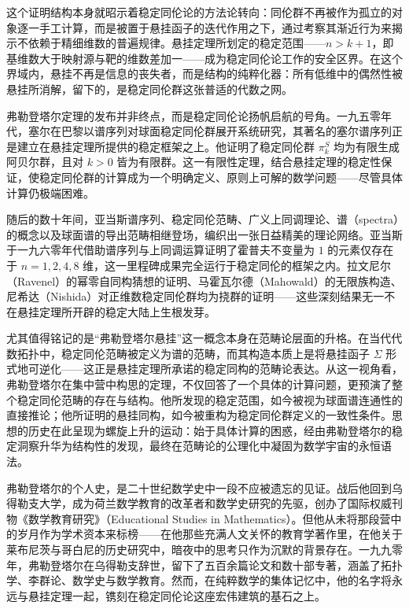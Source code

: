 \documentclass[12pt,a4paper]{article}
\begin{document}
这个证明结构本身就昭示着稳定同伦论的方法论转向：同伦群不再被作为孤立的对象逐一手工计算，而是被置于悬挂函子的迭代作用之下，通过考察其渐近行为来揭示不依赖于精细维数的普遍规律。悬挂定理所划定的稳定范围——$n>k+1$，即基维数大于映射源与靶的维数差加一——成为稳定同伦论工作的安全区界。在这个界域内，悬挂不再是信息的丧失者，而是结构的纯粹化器：所有低维中的偶然性被悬挂所消解，留下的，是稳定同伦群这张普适的代数之网。

弗勒登塔尔定理的发布并非终点，而是稳定同伦论扬帆启航的号角。一九五零年代，塞尔在巴黎以谱序列对球面稳定同伦群展开系统研究，其著名的塞尔谱序列正是建立在悬挂定理所提供的稳定框架之上。他证明了稳定同伦群 $\pi_k^S$ 均为有限生成阿贝尔群，且对 $k>0$ 皆为有限群。这一有限性定理，结合悬挂定理的稳定性保证，使稳定同伦群的计算成为一个明确定义、原则上可解的数学问题——尽管具体计算仍极端困难。

随后的数十年间，亚当斯谱序列、稳定同伦范畴、广义上同调理论、谱（spectra）的概念以及球面谱的导出范畴相继登场，编织出一张日益精美的理论网络。亚当斯于一九六零年代借助谱序列与上同调运算证明了霍普夫不变量为 $1$ 的元素仅存在于 $n=1,2,4,8$ 维，这一里程碑成果完全运行于稳定同伦的框架之内。拉文尼尔（Ravenel）的幂零自同构猜想的证明、马霍瓦尔德（Mahowald）的无限族构造、尼希达（Nishida）对正维数稳定同伦群均为挠群的证明——这些深刻结果无一不在悬挂定理所开辟的稳定大陆上生根发芽。

尤其值得铭记的是“弗勒登塔尔悬挂”这一概念本身在范畴论层面的升格。在当代代数拓扑中，稳定同伦范畴被定义为谱的范畴，而其构造本质上是将悬挂函子 $\Sigma$ 形式地可逆化——这正是悬挂定理所承诺的稳定同构的范畴论表达。从这一视角看，弗勒登塔尔在集中营中构思的定理，不仅回答了一个具体的计算问题，更预演了整个稳定同伦范畴的存在与结构。他所发现的稳定范围，如今被视为球面谱连通性的直接推论；他所证明的悬挂同构，如今被重构为稳定同伦群定义的一致性条件。思想的历史在此呈现为螺旋上升的运动：始于具体计算的困惑，经由弗勒登塔尔的稳定洞察升华为结构性的发现，最终在范畴论的公理化中凝固为数学宇宙的永恒语法。

弗勒登塔尔的个人史，是二十世纪数学史中一段不应被遗忘的见证。战后他回到乌得勒支大学，成为荷兰数学教育的改革者和数学史研究的先驱，创办了国际权威刊物《数学教育研究》（Educational Studies in Mathematics）。但他从未将那段营中的岁月作为学术资本来标榜——在他那些充满人文关怀的教育学著作里，在他关于莱布尼茨与哥白尼的历史研究中，暗夜中的思考只作为沉默的背景存在。一九九零年，弗勒登塔尔在乌得勒支辞世，留下了五百余篇论文和数十部专著，涵盖了拓扑学、李群论、数学史与数学教育。然而，在纯粹数学的集体记忆中，他的名字将永远与悬挂定理一起，镌刻在稳定同伦论这座宏伟建筑的基石之上。
\end{document}
